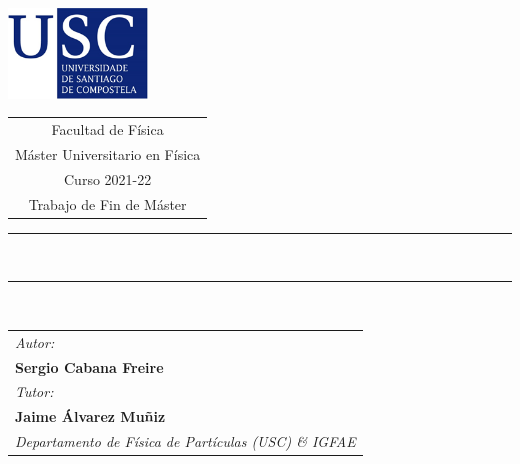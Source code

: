\documentclass[11 pt, a4paper]{article} %
\numberwithin{equation}{section}
\numberwithin{figure}{section}
\numberwithin{table}{section}
\begin{document}
	\begin{center}
		\vspace{3em}
		\includegraphics[width=10em]{figures/USC.png}
		\hspace{1cm}
		\begin{tabular}[b]{c}
			{\large\color{usc} \sc Facultad de Física} \vspace{0.5em}\\
			{\large\color{usc} \sc Máster Universitario en Física} \vspace{0.5em}\\  %
			{\large\color{usc}  Curso 2021-22} \vspace{0.5em}\\%
			{\Large\color{usc} \sc Trabajo de Fin de Máster} %
		\end{tabular}
		
		
		
		\vspace{3cm}
		\rule{65mm}{0.2mm}\\
		\vspace{1cm}
		
		{\sc\LARGE \TituloDoTraballo}
		
		{\sl\large \EspecialidadeMaster}
		
		
		
		\vspace{0.5cm}
		\rule{65mm}{0.2mm}\\
		\vspace{2cm}
	\end{center}
	
	
	\begin{tabular}{l}
		{\sl\large Autor:} \\
		{\bf\Large Sergio Cabana Freire} %
		\vspace{1em}\mbox{} \\
		{\sl\large Tutor:} \\
		{\bf\large Jaime Álvarez Muñiz} \\
		{\sl\large Departamento de Física de Partículas (USC) \& IGFAE}
		\vspace{1em}\mbox{} \\
	\end{tabular}
	
\end{document}

